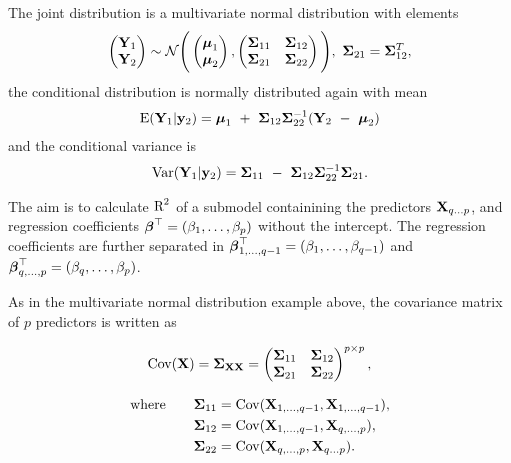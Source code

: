 \documentclass[11pt,a4paper,twoside]{book}
\begin{document}
The joint distribution is a multivariate normal distribution with elements
\begin{align*}
\begin{pmatrix}
\mathbf{Y}_{1} \\ 
\mathbf{Y}_{2} \end{pmatrix} \sim \mathcal{N}
\Bigg(\begin{pmatrix}
\boldsymbol{\mu}_{1} \\ 
\boldsymbol{\mu}_{2} 
\end{pmatrix},
\begin{pmatrix}
{\boldsymbol{\Sigma}}{}_{11} & {\boldsymbol{\Sigma}}{}_{12} \\
{\boldsymbol{\Sigma}}{}_{21} & {\boldsymbol{\Sigma}}{}_{22} \\
\end{pmatrix}\Bigg),
\ {\boldsymbol{\Sigma}}{}_{21} = {\boldsymbol{\Sigma}}{}_{12}^{T},
\end{align*}
the conditional distribution is normally distributed again with mean 
\begin{align*}
\E (\mathbf{Y}_{1} | \mathbf{y}_{2} ) = \boldsymbol{\mu}_{1}\ +\ \bSigma_{12} \bSigma_{22}^{-1}(\mathbf{Y}_{2}\ -\ \boldsymbol{\mu}_{2})
\end{align*}
and the conditional variance is
\begin{align}
\operatorname{Var} ( \mathbf{Y}_{1} | \mathbf{y}_{2} ) = {\boldsymbol{\Sigma}}{}_{11}\ -\ {\boldsymbol{\Sigma}}{}_{12} {\boldsymbol{\Sigma}}{}_{22}^{-1}{\boldsymbol{\Sigma}}{}_{21} \text{.} \label{eq:condvar} 
\end{align}

The aim is to calculate $\text{R}^2$ of a submodel containining the predictors ${\mathbf{X}}_{q...p}$, and regression coefficients ${\boldsymbol{\beta}}^\top = (\beta_{1}, \dotsc, \beta_{p})$ without the intercept. The regression coefficients are further separated in ${\boldsymbol{\beta}}^\top_{1  ,\dotsc,  q-1} = (\beta_{1} ,\dotsc, \beta_{q-1})$ and ${\boldsymbol{\beta}}^\top_{q ,\dotsc, p} = (\beta_{q} ,\dotsc, \beta_{p})$. 

As in the multivariate normal distribution example above, the covariance matrix of $p$ predictors is written as 

      \begin{align*} 
\operatorname{Cov}({\mathbf{X}}) =	{\boldsymbol{\Sigma}}{}_{{\mathbf{X}} {\mathbf{X}}} = \begin{pmatrix}
{\boldsymbol{\Sigma}}{}_{11} & {\boldsymbol{\Sigma}}{}_{12} \\
{\boldsymbol{\Sigma}}{}_{21} & {\boldsymbol{\Sigma}}{}_{22}  \\
\end{pmatrix}^{p \times p}, 
   \end{align*}
   
         \begin{align*} 
   \text{where} \qquad {\boldsymbol{\Sigma}}{}_{11} &= \operatorname{Cov}({\mathbf{X}}_{1,\dotsc, q-1}, {\mathbf{X}}_{1 ,\dotsc,q-1}), \\ {\boldsymbol{\Sigma}}{}_{12} &= \operatorname{Cov}({\mathbf{X}}_{1,\dotsc, q-1}, {\mathbf{X}}_{q ,\dotsc, p}),\\ {\boldsymbol{\Sigma}}{}_{22} &= \operatorname{Cov}({\mathbf{X}}_{q ,\dotsc, p}, {\mathbf{X}}_{q \dots p}) \text{.} \nonumber
      \end{align*}
      
\end{document}
